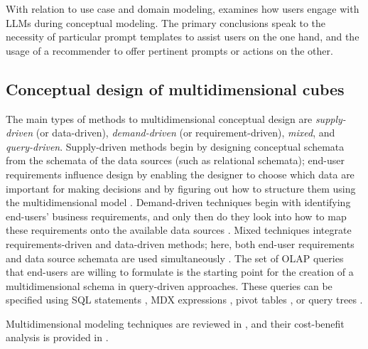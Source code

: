 With relation to use case and domain modeling, \cite{Ali24} examines how users engage with LLMs during conceptual modeling. The primary conclusions speak to the necessity of particular prompt templates to assist users on the one hand, and the usage of a recommender to offer pertinent prompts or actions on the other.


\subsection{Conceptual design of multidimensional cubes}

The main types of methods to multidimensional conceptual design are \emph{supply-driven} (or data-driven), \emph{demand-driven} (or requirement-driven), \emph{mixed}, and \emph{query-driven}. Supply-driven methods begin by designing conceptual schemata from the schemata of the data sources (such as relational schemata); end-user requirements influence design by enabling the designer to choose which data are important for making decisions and by figuring out how to structure them using the multidimensional model \cite{DBLP:conf/ssdbm/RomeroA11}. Demand-driven techniques begin with identifying end-users' business requirements, and only then do they look into how to map these requirements onto the available data sources \cite{DBLP:journals/is/0001RSAM14}.
Mixed techniques integrate requirements-driven and data-driven methods; here, both end-user requirements and data source schemata are used simultaneously \cite{DBLP:journals/infsof/TriaLT12}. The set of OLAP queries that end-users are willing to formulate is the starting point for the creation of a multidimensional schema in query-driven approaches. These queries can be specified using SQL statements \cite{DBLP:journals/dke/RomeroA10}, MDX expressions \cite{Niemi.2001}, pivot tables \cite{Bimonte.2021}, or query trees \cite{Nair.2007}.

Multidimensional modeling techniques are reviewed in \cite{DBLP:journals/jdwm/RomeroA09}, and their cost-benefit analysis is provided in \cite{DBLP:journals/is/TriaLT17}.